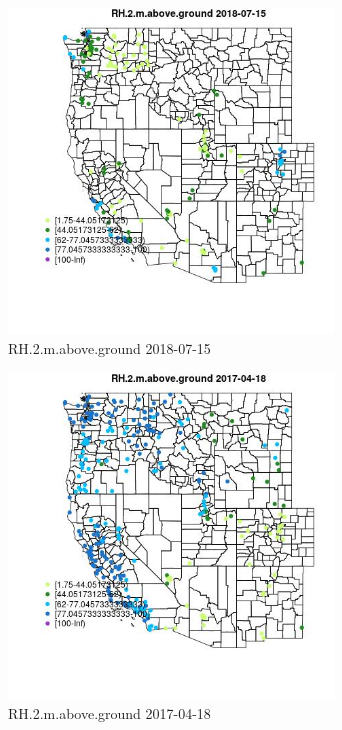 \begin{figure} 
\centering  
\includegraphics[width=0.77\textwidth]{Code_Outputs/Report_ML_input_PM25_Step4_part_e_de_duplicated_aves_compiled_2019-05-21wNAs_MapObsRH2maboveground2018-07-15.jpg} 
\caption{\label{fig:Report_ML_input_PM25_Step4_part_e_de_duplicated_aves_compiled_2019-05-21wNAsMapObsRH2maboveground2018-07-15}RH.2.m.above.ground 2018-07-15} 
\end{figure} 
 

\begin{figure} 
\centering  
\includegraphics[width=0.77\textwidth]{Code_Outputs/Report_ML_input_PM25_Step4_part_e_de_duplicated_aves_compiled_2019-05-21wNAs_MapObsRH2maboveground2017-04-18.jpg} 
\caption{\label{fig:Report_ML_input_PM25_Step4_part_e_de_duplicated_aves_compiled_2019-05-21wNAsMapObsRH2maboveground2017-04-18}RH.2.m.above.ground 2017-04-18} 
\end{figure} 
 

